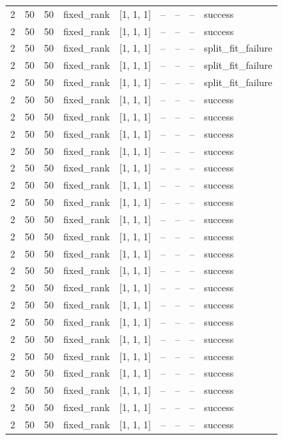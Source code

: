 \begin{longtable}{lllllllll}
2 & 50 & 50 & fixed\_rank & [1, 1, 1] & -- & -- & -- & success \\
2 & 50 & 50 & fixed\_rank & [1, 1, 1] & -- & -- & -- & success \\
2 & 50 & 50 & fixed\_rank & [1, 1, 1] & -- & -- & -- & split\_fit\_failure \\
2 & 50 & 50 & fixed\_rank & [1, 1, 1] & -- & -- & -- & split\_fit\_failure \\
2 & 50 & 50 & fixed\_rank & [1, 1, 1] & -- & -- & -- & split\_fit\_failure \\
2 & 50 & 50 & fixed\_rank & [1, 1, 1] & -- & -- & -- & success \\
2 & 50 & 50 & fixed\_rank & [1, 1, 1] & -- & -- & -- & success \\
2 & 50 & 50 & fixed\_rank & [1, 1, 1] & -- & -- & -- & success \\
2 & 50 & 50 & fixed\_rank & [1, 1, 1] & -- & -- & -- & success \\
2 & 50 & 50 & fixed\_rank & [1, 1, 1] & -- & -- & -- & success \\
2 & 50 & 50 & fixed\_rank & [1, 1, 1] & -- & -- & -- & success \\
2 & 50 & 50 & fixed\_rank & [1, 1, 1] & -- & -- & -- & success \\
2 & 50 & 50 & fixed\_rank & [1, 1, 1] & -- & -- & -- & success \\
2 & 50 & 50 & fixed\_rank & [1, 1, 1] & -- & -- & -- & success \\
2 & 50 & 50 & fixed\_rank & [1, 1, 1] & -- & -- & -- & success \\
2 & 50 & 50 & fixed\_rank & [1, 1, 1] & -- & -- & -- & success \\
2 & 50 & 50 & fixed\_rank & [1, 1, 1] & -- & -- & -- & success \\
2 & 50 & 50 & fixed\_rank & [1, 1, 1] & -- & -- & -- & success \\
2 & 50 & 50 & fixed\_rank & [1, 1, 1] & -- & -- & -- & success \\
2 & 50 & 50 & fixed\_rank & [1, 1, 1] & -- & -- & -- & success \\
2 & 50 & 50 & fixed\_rank & [1, 1, 1] & -- & -- & -- & success \\
2 & 50 & 50 & fixed\_rank & [1, 1, 1] & -- & -- & -- & success \\
2 & 50 & 50 & fixed\_rank & [1, 1, 1] & -- & -- & -- & success \\
2 & 50 & 50 & fixed\_rank & [1, 1, 1] & -- & -- & -- & success \\
2 & 50 & 50 & fixed\_rank & [1, 1, 1] & -- & -- & -- & success \\

\end{longtable}
